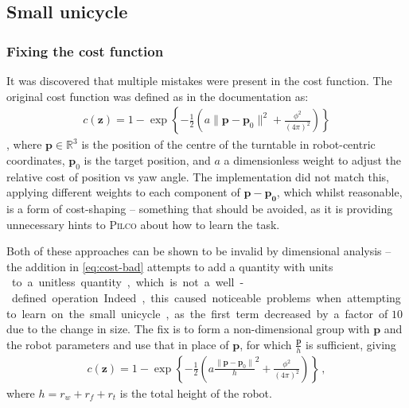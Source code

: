 \documentclass[main.tex]{subfiles}
\begin{document}
\subsection{Small unicycle}

	\subsubsection{Fixing the cost function}
	\label{sec:cost-function}
	It was discovered that multiple mistakes were present in the cost function. The original cost function was defined as in the documentation as:
	\begin{align}
		c(\bm z) = 1 - \exp\left\{-\frac{1}{2}\left(a\|\bm{p} - \bm p_0\|^2+ \frac{\phi^2}{(4\pi)^2}\right)\right\} \label{eq:cost-bad}
	\end{align},
	where $\bm{p} \in \mathbb{R}^3$ is the position of the centre of the turntable in robot-centric coordinates, $\bm{p}_0$ is the target position, and $a$ a dimensionless weight to adjust the relative cost of position vs yaw angle.
	The implementation did not match this, applying different weights to each component of $\bm{p} - \bm{p_0}$, which whilst reasonable, is a form of cost-shaping -- something that should be avoided, as it is providing unnecessary hints to \textsc{Pilco} about how to learn the task.

	Both of these approaches can be shown to be invalid by dimensional analysis -- the addition in \cref{eq:cost-bad} attempts to add a quantity with units \si{\meter\square} to a unitless quantity, which is not a well-defined operation.
	Indeed, this caused noticeable problems when attempting to learn on the small unicycle, as the first term decreased by a factor of $10$ due to the change in size.
	The fix is to form a non-dimensional group with $\bm{p}$ and the robot parameters and use that in place of $\bm{p}$, for which $\frac{\bm{p}}{h}$ is sufficient, giving
	\begin{align}
		c(\bm z) = 1 - \exp\left\{-\frac{1}{2}\left(a\frac{\|\bm{p} - \bm p_0\|}{h}^2+ \frac{\phi^2}{(4\pi)^2}\right)\right\} \,, \label{eq:correct-cost}
	\end{align}
	where $h = r_w + r_f + r_t$ is the total height of the robot.
\end{document}
